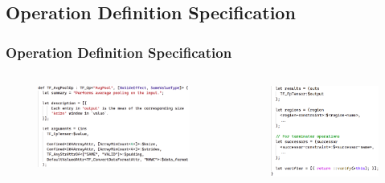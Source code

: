 \documentclass{beamer}
\begin{document}
\subsection{Operation Definition Specification}
\begin{frame}
  \frametitle{Operation Definition Specification}
  \begin{columns}
    \begin{column}{0.6\textwidth}
      \begin{figure}[h]
        \raggedright
        \includegraphics[width=\textwidth]{pictures/Op1.png}
      \end{figure}
    \end{column}
    \begin{column}{0.4\textwidth}
      \begin{figure}[h]
        \raggedright
        \includegraphics[width=\textwidth]{pictures/Op2.png}
      \end{figure}
    \end{column}
  \end{columns}
\end{frame}
\end{document}
